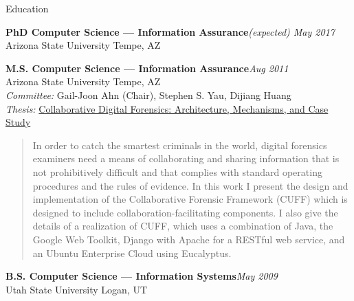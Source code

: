 
\begin{rSection}{Education}

\textbf{PhD Computer Science --- Information Assurance}\hfill \emph{(expected) May 2017}\\
Arizona State University \hfill {Tempe, AZ}

\textbf{M.S. Computer Science --- Information Assurance}\hfill \emph{Aug 2011}\\
Arizona State University \hfill {Tempe, AZ}\\
\textit{Committee:} Gail-Joon Ahn (Chair), Stephen S. Yau, Dijiang Huang\\
\textit{Thesis:} \href{http://repository.asu.edu/attachments/56996/content/Mabey_asu_0010N_10959.pdf}{Collaborative Digital Forensics: Architecture, Mechanisms, and Case Study}\\
\begin{quote}
  \vspace{-3ex}
  In order to catch the smartest criminals in the world, digital forensics examiners need a means of collaborating and sharing information that is not prohibitively difficult and that complies with standard operating procedures and the rules of evidence. In this work I present the design and implementation of the Collaborative Forensic Framework (CUFF) which is designed to include collaboration-facilitating components. I also give the details of a realization of CUFF, which uses a combination of Java, the Google Web Toolkit, Django with Apache for a RESTful web service, and an Ubuntu Enterprise Cloud using Eucalyptus.
\end{quote}

\textbf{B.S. Computer Science --- Information Systems}\hfill \emph{May 2009}\\
Utah State University \hfill {Logan, UT}

\end{rSection}
